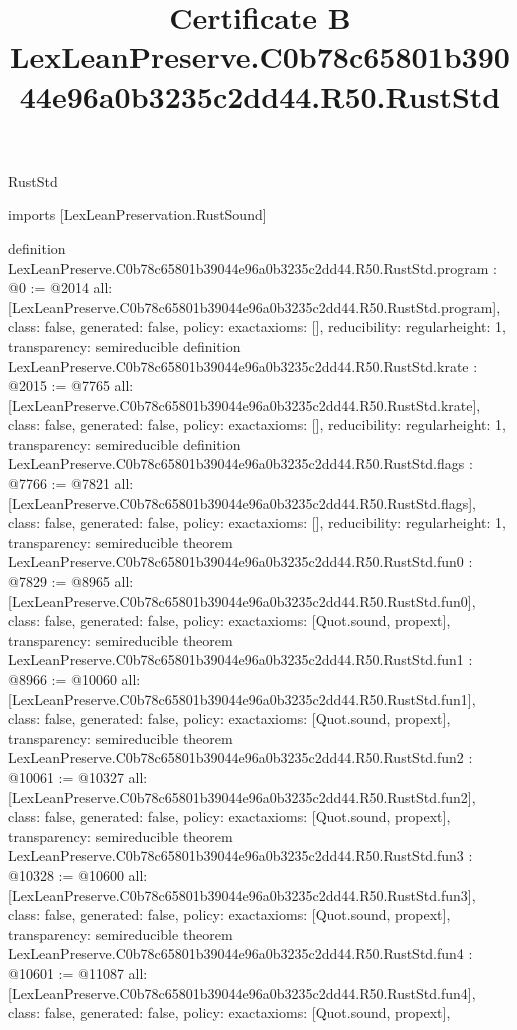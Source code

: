 \begin{lexlean}{RustStd}
\title{Certificate B LexLeanPreserve.C0b78c65801b39044e96a0b3235c2dd44.R50.RustStd}
\begin{coremodule}
imports [LexLeanPreservation.RustSound]

definition LexLeanPreserve.C0b78c65801b39044e96a0b3235c2dd44.R50.RustStd.program : @0 := @2014 {
  all: [LexLeanPreserve.C0b78c65801b39044e96a0b3235c2dd44.R50.RustStd.program],
  class: false,
  generated: false,
  policy: exact{axioms: []},
  reducibility: regular{height: 1},
  transparency: semireducible
}
definition LexLeanPreserve.C0b78c65801b39044e96a0b3235c2dd44.R50.RustStd.krate : @2015 := @7765 {
  all: [LexLeanPreserve.C0b78c65801b39044e96a0b3235c2dd44.R50.RustStd.krate],
  class: false,
  generated: false,
  policy: exact{axioms: []},
  reducibility: regular{height: 1},
  transparency: semireducible
}
definition LexLeanPreserve.C0b78c65801b39044e96a0b3235c2dd44.R50.RustStd.flags : @7766 := @7821 {
  all: [LexLeanPreserve.C0b78c65801b39044e96a0b3235c2dd44.R50.RustStd.flags],
  class: false,
  generated: false,
  policy: exact{axioms: []},
  reducibility: regular{height: 1},
  transparency: semireducible
}
theorem LexLeanPreserve.C0b78c65801b39044e96a0b3235c2dd44.R50.RustStd.fun0 : @7829 := @8965 {
  all: [LexLeanPreserve.C0b78c65801b39044e96a0b3235c2dd44.R50.RustStd.fun0],
  class: false,
  generated: false,
  policy: exact{axioms: [Quot.sound, propext]},
  transparency: semireducible
}
theorem LexLeanPreserve.C0b78c65801b39044e96a0b3235c2dd44.R50.RustStd.fun1 : @8966 := @10060 {
  all: [LexLeanPreserve.C0b78c65801b39044e96a0b3235c2dd44.R50.RustStd.fun1],
  class: false,
  generated: false,
  policy: exact{axioms: [Quot.sound, propext]},
  transparency: semireducible
}
theorem LexLeanPreserve.C0b78c65801b39044e96a0b3235c2dd44.R50.RustStd.fun2 : @10061 := @10327 {
  all: [LexLeanPreserve.C0b78c65801b39044e96a0b3235c2dd44.R50.RustStd.fun2],
  class: false,
  generated: false,
  policy: exact{axioms: [Quot.sound, propext]},
  transparency: semireducible
}
theorem LexLeanPreserve.C0b78c65801b39044e96a0b3235c2dd44.R50.RustStd.fun3 : @10328 := @10600 {
  all: [LexLeanPreserve.C0b78c65801b39044e96a0b3235c2dd44.R50.RustStd.fun3],
  class: false,
  generated: false,
  policy: exact{axioms: [Quot.sound, propext]},
  transparency: semireducible
}
theorem LexLeanPreserve.C0b78c65801b39044e96a0b3235c2dd44.R50.RustStd.fun4 : @10601 := @11087 {
  all: [LexLeanPreserve.C0b78c65801b39044e96a0b3235c2dd44.R50.RustStd.fun4],
  class: false,
  generated: false,
  policy: exact{axioms: [Quot.sound, propext]},
}
\end{coremodule}
\end{lexlean}
